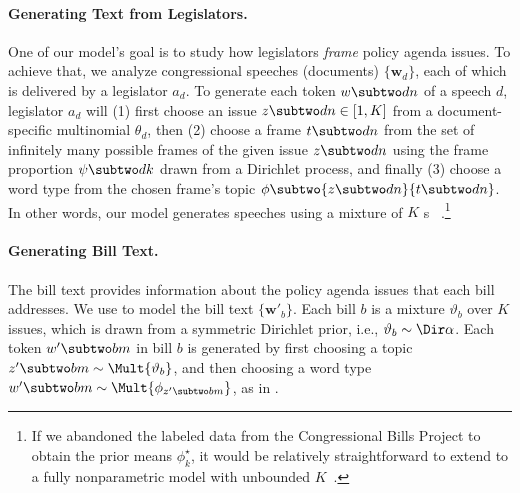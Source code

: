 \paragraph{Generating Text from Legislators.}
One of our model's goal is to study how legislators \textit{frame} policy agenda issues. To achieve that, we analyze congressional speeches (documents) $\{\bm w_d\}$, each of which is delivered by a legislator $a_d$. To generate each token $w \subtwo dn$ of a speech $d$, legislator $a_d$ will (1) first choose an issue $z \subtwo dn \in [1,K]$ from a document-specific multinomial $\theta_d$, then (2) choose a frame $t \subtwo dn$ from the set of infinitely many possible frames of the given issue $z \subtwo dn$ using the frame proportion $\psi \subtwo dk$ drawn from a Dirichlet process, and finally (3) choose a word type from the chosen frame's topic $\phi \subtwo {z \subtwo dn}{t \subtwo dn}$. In other words, our model generates speeches using a mixture of $K$ \hdp{}s ~\cite{Teh:JASA06:hdp}.\footnote{If we abandoned the labeled data from the Congressional Bills Project to obtain the prior means $\phi_k^{\star}$, it would be relatively straightforward to extend to a fully nonparametric model with unbounded $K$~\cite{Ahmed:ICML13:ncrf,Paisley:TPAMI14:nhdp}.}



\paragraph{Generating Bill Text.}
\label{subsec:c6_bill_text}
The bill text provides information about the policy agenda issues that each bill
addresses. We use \lda{} to model the bill text $\{\bm w'_b\}$. Each bill $b$ is
a mixture $\vartheta_b$ over $K$ issues, which is drawn from a symmetric
Dirichlet prior, i.e., $\vartheta_b \sim \Dir \alpha$. Each token $w' \subtwo
bm$ in bill $b$ is generated by first choosing a topic $z' \subtwo bm \sim \Mult
{\vartheta_b}$, and then choosing a word type $w' \subtwo bm \sim \Mult
{\phi_{z' \subtwo bm}}$, as in \lda{}.

